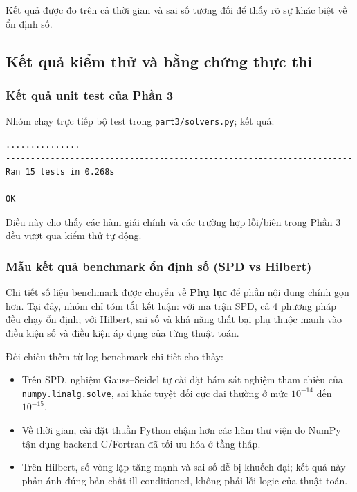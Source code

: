 \documentclass[a4paper]{article}
\begin{document}
Kết quả được đo trên cả thời gian và sai số tương đối để thấy rõ sự khác biệt về ổn định số.

\subsection{Kết quả kiểm thử và bằng chứng thực thi}

\subsubsection{Kết quả unit test của Phần 3}

Nhóm chạy trực tiếp bộ test trong \texttt{part3/solvers.py}; kết quả:

\begin{verbatim}
...............
----------------------------------------------------------------------
Ran 15 tests in 0.268s

OK
\end{verbatim}

Điều này cho thấy các hàm giải chính và các trường hợp lỗi/biên trong Phần 3 đều vượt qua kiểm thử tự động.

\subsubsection{Mẫu kết quả benchmark ổn định số (SPD vs Hilbert)}

Chi tiết số liệu benchmark được chuyển về \textbf{Phụ lục} để phần nội dung chính gọn hơn. Tại đây, nhóm chỉ tóm tắt kết luận: với ma trận SPD, cả 4 phương pháp đều chạy ổn định; với Hilbert, sai số và khả năng thất bại phụ thuộc mạnh vào điều kiện số và điều kiện áp dụng của từng thuật toán.

Đối chiếu thêm từ log benchmark chi tiết cho thấy:
\begin{itemize}
    \item Trên SPD, nghiệm Gauss--Seidel tự cài đặt bám sát nghiệm tham chiếu của \texttt{numpy.linalg.solve}, sai khác tuyệt đối cực đại thường ở mức $10^{-14}$ đến $10^{-15}$.
    \item Về thời gian, cài đặt thuần Python chậm hơn các hàm thư viện do NumPy tận dụng backend C/Fortran đã tối ưu hóa ở tầng thấp.
    \item Trên Hilbert, số vòng lặp tăng mạnh và sai số dễ bị khuếch đại; kết quả này phản ánh đúng bản chất ill-conditioned, không phải lỗi logic của thuật toán.
\end{itemize}
\end{document}
